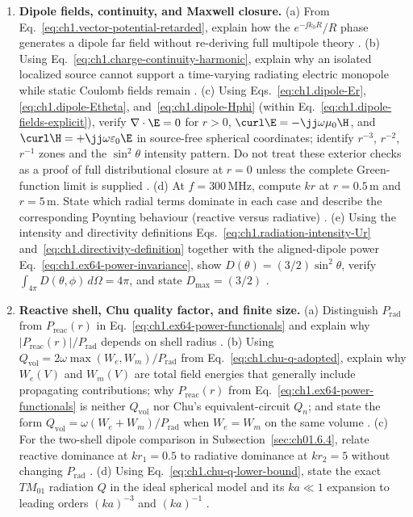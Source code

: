 \begin{enumerate}
\item \textbf{Dipole fields, continuity, and Maxwell closure.}
(a) From Eq.~\eqref{eq:ch1.vector-potential-retarded}, explain how the $e^{-\jj k_0 R}/R$ phase generates a dipole far field without re-deriving full multipole theory \cite{jackson1999,stratton1941}.
(b) Using Eq.~\eqref{eq:ch1.charge-continuity-harmonic}, explain why an isolated localized source cannot support a time-varying radiating electric monopole while static Coulomb fields remain \cite{maxwell1873,stratton1941}.
(c) Using Eqs.~\eqref{eq:ch1.dipole-Er}, \eqref{eq:ch1.dipole-Etheta}, and~\eqref{eq:ch1.dipole-Hphi} (within Eq.~\eqref{eq:ch1.dipole-fields-explicit}), verify $\nabla\cdot\E=0$ for $r>0$, $\curl\E=-\jj\omega\mu_0\H$, and $\curl\H=+\jj\omega\varepsilon_0\E$ in source-free spherical coordinates; identify $r^{-3}$, $r^{-2}$, $r^{-1}$ zones and the $\sin^2\theta$ intensity pattern. Do not treat these exterior checks as a proof of full distributional closure at $r=0$ unless the complete Green-function limit is supplied \cite{stratton1941,jackson1999}.
(d) At $f=300\,\mathrm{MHz}$, compute $kr$ at $r=0.5\,\mathrm{m}$ and $r=5\,\mathrm{m}$. State which radial terms dominate in each case and describe the corresponding Poynting behaviour (reactive versus radiative) \cite{stratton1941,poynting1884}.
(e) Using the intensity and directivity definitions Eqs.~\eqref{eq:ch1.radiation-intensity-Ur} and~\eqref{eq:ch1.directivity-definition} together with the aligned-dipole power Eq.~\eqref{eq:ch1.ex64-power-invariance}, show $D(\theta)=(3/2)\sin^2\theta$, verify $\int_{4\pi}D(\theta,\phi)\,d\Omega=4\pi$, and state $D_{\max}=(3/2)$ \cite{harrington2001,stratton1941}.

\item \textbf{Reactive shell, Chu quality factor, and finite size.}
(a) Distinguish $P_{\mathrm{rad}}$ from $P_{\mathrm{reac}}(r)$ in Eq.~\eqref{eq:ch1.ex64-power-functionals} and explain why $|P_{\mathrm{reac}}(r)|/P_{\mathrm{rad}}$ depends on shell radius \cite{poynting1884,stratton1941}.
(b) Using $Q_{\mathrm{vol}}=2\omega\max(W_e,W_m)/P_{\mathrm{rad}}$ from Eq.~\eqref{eq:ch1.chu-q-adopted}, explain why $W_e(V)$ and $W_m(V)$ are total field energies that generally include propagating contributions; why $P_{\mathrm{reac}}(r)$ from Eq.~\eqref{eq:ch1.ex64-power-functionals} is neither $Q_{\mathrm{vol}}$ nor Chu's equivalent-circuit $Q_n$; and state the form $Q_{\mathrm{vol}}=\omega(W_e+W_m)/P_{\mathrm{rad}}$ when $W_e=W_m$ on the same volume \cite{chu1948,mcclean1996}.
(c) For the two-shell dipole comparison in Subsection~\ref{sec:ch01.6.4}, relate reactive dominance at $kr_1=0.5$ to radiative dominance at $kr_2=5$ without changing $P_{\mathrm{rad}}$ \cite{stratton1941}.
(d) Using Eq.~\eqref{eq:ch1.chu-q-lower-bound}, state the exact $TM_{01}$ radiation $Q$ in the ideal spherical model and its $ka\ll1$ expansion to leading orders $(ka)^{-3}$ and $(ka)^{-1}$ \cite{chu1948,mcclean1996,harrington2001}.
\end{enumerate}

